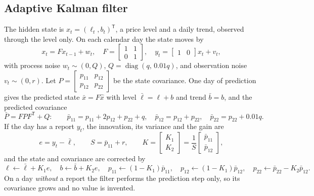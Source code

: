 \documentclass[12pt,a4paper,oneside]{report}
\numberwithin{equation}{chapter}
\numberwithin{figure}{chapter}
\numberwithin{table}{chapter}
\theoremstyle{definition}
\newcommand{\hatt}[1]{\widehat{#1}}
\newcommand{\trans}{^{\mathsf T}}
\begin{document}
\subsection{Adaptive Kalman filter}
The hidden state is $x_t=(\ell_t,b_t)\trans$, a price level and a daily trend, observed through the level only. On each calendar day the state moves by
\begin{equation}
  x_t=Fx_{t-1}+w_t,\quad F=\begin{bmatrix}1&1\\0&1\end{bmatrix},\quad
  y_t=\begin{bmatrix}1&0\end{bmatrix}x_t+v_t,
  \label{eq:kf}
\end{equation}
with process noise $w_t\sim(0,Q)$, $Q=\operatorname{diag}(q,\,0.01q)$, and observation noise $v_t\sim(0,r)$. Let $P=\begin{bmatrix}p_{11}&p_{12}\\p_{12}&p_{22}\end{bmatrix}$ be the state covariance. One day of prediction gives the predicted state $\bar x=F\hatt{x}$ with level $\bar\ell=\ell+b$ and trend $\bar b=b$, and the predicted covariance
\begin{equation}
  \bar P=FPF\trans+Q:\qquad \bar p_{11}=p_{11}+2p_{12}+p_{22}+q,\quad \bar p_{12}=p_{12}+p_{22},\quad \bar p_{22}=p_{22}+0.01q.
\end{equation}
If the day has a report $y_t$, the innovation, its variance and the gain are
\begin{equation}
  e=y_t-\bar\ell,\qquad S=\bar p_{11}+r,\qquad K=\begin{bmatrix}K_1\\K_2\end{bmatrix}=\frac{1}{S}\begin{bmatrix}\bar p_{11}\\\bar p_{12}\end{bmatrix},
\end{equation}
and the state and covariance are corrected by
\begin{equation}
  \ell\leftarrow\bar\ell+K_1e,\quad b\leftarrow\bar b+K_2e,\quad
  p_{11}\leftarrow(1-K_1)\bar p_{11},\quad p_{12}\leftarrow(1-K_1)\bar p_{12},\quad p_{22}\leftarrow\bar p_{22}-K_2\bar p_{12}.
\end{equation}
On a day \emph{without} a report the filter performs the prediction step only, so its covariance grows and no value is invented.
\end{document}

